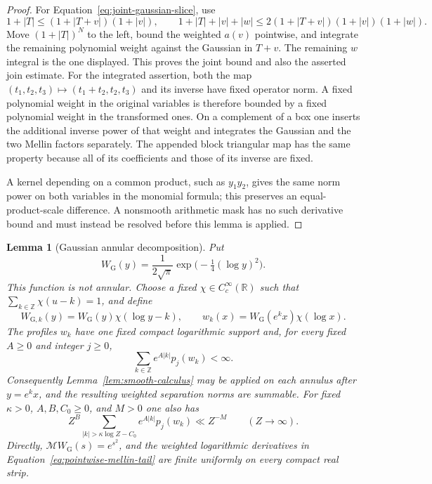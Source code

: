 \documentclass[11pt,a4paper]{article}
\numberwithin{equation}{section}
\numberwithin{figure}{section}
\newtheorem{lemma}[theorem]{Lemma}
\theoremstyle{definition}
\theoremstyle{remark}
\begin{document}
\begin{proof}
For Equation~\eqref{eq:joint-gaussian-slice}, use
\[
 1+|T|\le(1+|T+v|)(1+|v|),\qquad
 1+|T|+|v|+|w|\le2(1+|T+v|)(1+|v|)(1+|w|).
\]
Move $(1+|T|)^N$ to the left, bound the weighted $a(v)$ pointwise, and
integrate the remaining polynomial weight against the Gaussian in $T+v$.
The remaining $w$ integral is the one displayed.  This proves the joint
bound and also the asserted join estimate.  For the integrated assertion,
both the map $(t_1,t_2,t_3)\mapsto(t_1+t_2,t_2,t_3)$ and its inverse have
fixed operator norm.  A fixed polynomial weight in the original variables
is therefore bounded by a fixed polynomial weight in the transformed ones.
On a complement of a box one inserts the additional inverse power of that
weight and integrates the Gaussian and the two Mellin factors separately.
The appended block triangular map has the same property because all of its
coefficients and those of its inverse are fixed.

A kernel depending on a common product, such as $y_1y_2$,
gives the same norm power on both variables in the monomial formula; this
preserves an equal-product-scale difference.  A nonsmooth arithmetic mask
has no such derivative bound and must instead be resolved before this lemma
is applied.
\end{proof}

\begin{lemma}[Gaussian annular decomposition]\label{lem:gaussian-annular}
Put
\[
 W_{\mathrm G}(y)=\frac1{2\sqrt\pi}
                         \exp\bigl(-\tfrac14(\log y)^2\bigr).
\]
This function is not annular.  Choose a fixed $\chi\in C_c^\infty(\mathbb R)$
such that $\sum_{k\in\mathbb Z}\chi(u-k)=1$, and define
\[
 W_{{\mathrm G},k}(y)=W_{\mathrm G}(y)\chi(\log y-k),\qquad
 w_k(x)=W_{\mathrm G}(e^k x)\chi(\log x).
\]
The profiles $w_k$ have one fixed compact logarithmic support and, for every
fixed $A\ge0$ and integer $j\ge0$,
\begin{equation}\label{eq:gaussian-annular-sum}
 \sum_{k\in\mathbb Z}e^{A|k|}p_j(w_k)<\infty.
\end{equation}
Consequently Lemma~\ref{lem:smooth-calculus} may be applied on each annulus
after $y=e^k x$, and the resulting weighted separation norms are summable.
For fixed $\kappa>0$, $A,B,C_0\ge0$, and $M>0$ one also has
\[
 Z^B\sum_{|k|>\kappa\log Z-C_0}e^{A|k|}p_j(w_k)\ll Z^{-M}
       \qquad(Z\to\infty).
\]
Directly, $\mathcal MW_{\mathrm G}(s)=e^{s^2}$, and the weighted logarithmic
derivatives in Equation~\eqref{eq:pointwise-mellin-tail} are finite uniformly
on every compact real strip.
\end{lemma}
\end{document}
